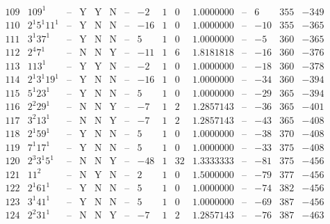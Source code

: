 \documentclass[11pt,reqno,a4letter]{article}
\numberwithin{figure}{section}
\numberwithin{table}{section}
\theoremstyle{plain}
\numberwithin{theorem}{section}
\theoremstyle{definition}
\begin{document}
\begin{table}[h!]
\begin{equation*}
{\begin{array}{|cc|c|ccc|c|c|ccc|c|ccc}
 109 & 109^1 & \text{--} & \text{Y} & \text{Y} & \text{N} & \text{--} & -2 & 1 & 0 & 1.0000000 & \text{--} & 6 & 355 & -349 \\
 110 & 2^1 5^1 11^1 & \text{--} & \text{Y} & \text{N} & \text{N} & \text{--} & -16 & 1 & 0 & 1.0000000 & \text{--} & -10 & 355 & -365 \\
 111 & 3^1 37^1 & \text{--} & \text{Y} & \text{N} & \text{N} & \text{--} & 5 & 1 & 0 & 1.0000000 & \text{--} & -5 & 360 & -365 \\
 112 & 2^4 7^1 & \text{--} & \text{N} & \text{N} & \text{Y} & \text{--} & -11 & 1 & 6 & 1.8181818 & \text{--} & -16 & 360 & -376 \\
 113 & 113^1 & \text{--} & \text{Y} & \text{Y} & \text{N} & \text{--} & -2 & 1 & 0 & 1.0000000 & \text{--} & -18 & 360 & -378 \\
 114 & 2^1 3^1 19^1 & \text{--} & \text{Y} & \text{N} & \text{N} & \text{--} & -16 & 1 & 0 & 1.0000000 & \text{--} & -34 & 360 & -394 \\
 115 & 5^1 23^1 & \text{--} & \text{Y} & \text{N} & \text{N} & \text{--} & 5 & 1 & 0 & 1.0000000 & \text{--} & -29 & 365 & -394 \\
 116 & 2^2 29^1 & \text{--} & \text{N} & \text{N} & \text{Y} & \text{--} & -7 & 1 & 2 & 1.2857143 & \text{--} & -36 & 365 & -401 \\
 117 & 3^2 13^1 & \text{--} & \text{N} & \text{N} & \text{Y} & \text{--} & -7 & 1 & 2 & 1.2857143 & \text{--} & -43 & 365 & -408 \\
 118 & 2^1 59^1 & \text{--} & \text{Y} & \text{N} & \text{N} & \text{--} & 5 & 1 & 0 & 1.0000000 & \text{--} & -38 & 370 & -408 \\
 119 & 7^1 17^1 & \text{--} & \text{Y} & \text{N} & \text{N} & \text{--} & 5 & 1 & 0 & 1.0000000 & \text{--} & -33 & 375 & -408 \\
 120 & 2^3 3^1 5^1 & \text{--} & \text{N} & \text{N} & \text{Y} & \text{--} & -48 & 1 & 32 & 1.3333333 & \text{--} & -81 & 375 & -456 \\
 121 & 11^2 & \text{--} & \text{N} & \text{Y} & \text{N} & \text{--} & 2 & 1 & 0 & 1.5000000 & \text{--} & -79 & 377 & -456 \\
 122 & 2^1 61^1 & \text{--} & \text{Y} & \text{N} & \text{N} & \text{--} & 5 & 1 & 0 & 1.0000000 & \text{--} & -74 & 382 & -456 \\
 123 & 3^1 41^1 & \text{--} & \text{Y} & \text{N} & \text{N} & \text{--} & 5 & 1 & 0 & 1.0000000 & \text{--} & -69 & 387 & -456 \\
 124 & 2^2 31^1 & \text{--} & \text{N} & \text{N} & \text{Y} & \text{--} & -7 & 1 & 2 & 1.2857143 & \text{--} & -76 & 387 & -463 \\
\end{array}
}
\end{equation*}

\end{table} 
\end{document}
